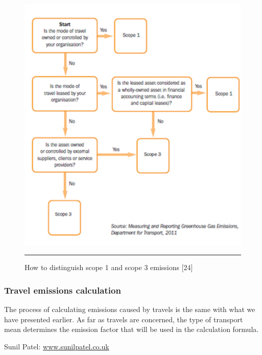 \begin{figure}[htbp]
	\centering
		\includegraphics{./Figures/figure17.pdf}
		\rule{35em}{0.5pt}
	\caption[Seperating Scope 1 and Scope 3 Emissions]{How to distinguish scope 1 and scope 3 emissions [24]}
	\label{fig:scope1Scope3}
\end{figure}


\subsubsection{Travel emissions calculation}

The process of calculating emissions caused by travels is the same with what we have presented earlier. As far as travels are concerned, the type of transport mean determines the emission factor that will be used in the calculation formula.


\begin{flushright}
Sunil Patel: \href{http://www.sunilpatel.co.uk}{www.sunilpatel.co.uk}
\end{flushright}
